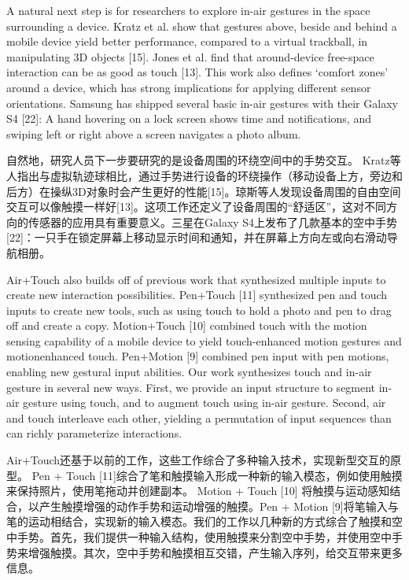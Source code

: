 A natural next step is for researchers to explore in-air gestures in the space surrounding a device. Kratz et al. show that gestures above, beside and behind a mobile device yield better performance, compared to a virtual trackball, in manipulating 3D objects [15]. Jones et al. find that around-device free-space interaction can be as good as touch [13]. This work also defines ‘comfort zones’ around a device, which has strong implications for applying different sensor orientations. Samsung has shipped several basic in-air gestures with their Galaxy S4 [22]: A hand hovering on a lock screen shows time and notifications, and swiping left or right above a screen navigates a photo album. 

自然地，研究人员下一步要研究的是设备周围的环绕空间中的手势交互。 Kratz等人指出与虚拟轨迹球相比，通过手势进行设备的环绕操作（移动设备上方，旁边和后方）在操纵3D对象时会产生更好的性能[15]。琼斯等人发现设备周围的自由空间交互可以像触摸一样好[13]。这项工作还定义了设备周围的“舒适区”，这对不同方向的传感器的应用具有重要意义。三星在Galaxy S4上发布了几款基本的空中手势[22]：一只手在锁定屏幕上移动显示时间和通知，并在屏幕上方向左或向右滑动导航相册。 

Air+Touch also builds off of previous work that synthesized multiple inputs to create new interaction possibilities. Pen+Touch [11] synthesized pen and touch inputs to create new tools, such as using touch to hold a photo and pen to drag off and create a copy. Motion+Touch [10] combined touch with the motion sensing capability of a mobile device to yield touch-enhanced motion gestures and motionenhanced touch. Pen+Motion [9] combined pen input with pen motions, enabling new gestural input abilities. Our work synthesizes touch and in-air gesture in several new ways. First, we provide an input structure to segment in-air gesture using touch, and to augment touch using in-air gesture. Second, air and touch interleave each other, yielding a permutation of input sequences than can richly parameterize interactions. 

Air+Touch还基于以前的工作，这些工作综合了多种输入技术，实现新型交互的原型。 Pen + Touch [11]综合了笔和触摸输入形成一种新的输入模态，例如使用触摸来保持照片，使用笔拖动并创建副本。 Motion + Touch [10] 将触摸与运动感知结合，以产生触摸增强的动作手势和运动增强的触摸。Pen + Motion [9]将笔输入与笔的运动相结合，实现新的输入模态。我们的工作以几种新的方式综合了触摸和空中手势。首先，我们提供一种输入结构，使用触摸来分割空中手势，并使用空中手势来增强触摸。其次，空中手势和触摸相互交错，产生输入序列，给交互带来更多信息。

